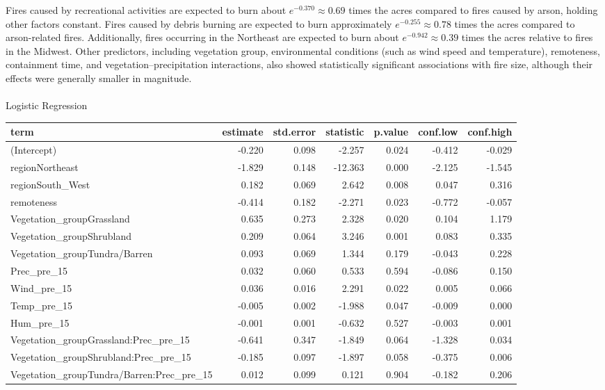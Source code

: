 \documentclass[
  letterpaper,
  DIV=11,
  numbers=noendperiod]{scrartcl}
\makeatletter
\let\oldparagraph\paragraph
\renewcommand{\paragraph}{
    \@ifstar
      \xxxParagraphStar
      \xxxParagraphNoStar
  }
\newcommand{\xxxParagraphStar}[1]{\oldparagraph*{#1}\mbox{}}
\newcommand{\xxxParagraphNoStar}[1]{\oldparagraph{#1}\mbox{}}
\makeatother
\begin{document}
Fires caused by recreational activities are expected to burn about
\(e^{-0.370} \approx 0.69\) times the acres compared to fires caused by
arson, holding other factors constant. Fires caused by debris burning
are expected to burn approximately \(e^{-0.255} \approx 0.78\) times the
acres compared to arson-related fires. Additionally, fires occurring in
the Northeast are expected to burn about \(e^{-0.942} \approx 0.39\)
times the acres relative to fires in the Midwest. Other predictors,
including vegetation group, environmental conditions (such as wind speed
and temperature), remoteness, containment time, and
vegetation--precipitation interactions, also showed statistically
significant associations with fire size, although their effects were
generally smaller in magnitude.

\paragraph{Logistic Regression}\label{logistic-regression-1}

\begin{table}[!h]
\centering\begingroup\fontsize{7}{9}\selectfont

\begin{tabular}{lrrrrrr}
\toprule
term & estimate & std.error & statistic & p.value & conf.low & conf.high\\
\midrule
(Intercept) & -0.220 & 0.098 & -2.257 & 0.024 & -0.412 & -0.029\\
regionNortheast & -1.829 & 0.148 & -12.363 & 0.000 & -2.125 & -1.545\\
regionSouth\_West & 0.182 & 0.069 & 2.642 & 0.008 & 0.047 & 0.316\\
remoteness & -0.414 & 0.182 & -2.271 & 0.023 & -0.772 & -0.057\\
Vegetation\_groupGrassland & 0.635 & 0.273 & 2.328 & 0.020 & 0.104 & 1.179\\
\addlinespace
Vegetation\_groupShrubland & 0.209 & 0.064 & 3.246 & 0.001 & 0.083 & 0.335\\
Vegetation\_groupTundra/Barren & 0.093 & 0.069 & 1.344 & 0.179 & -0.043 & 0.228\\
Prec\_pre\_15 & 0.032 & 0.060 & 0.533 & 0.594 & -0.086 & 0.150\\
Wind\_pre\_15 & 0.036 & 0.016 & 2.291 & 0.022 & 0.005 & 0.066\\
Temp\_pre\_15 & -0.005 & 0.002 & -1.988 & 0.047 & -0.009 & 0.000\\
\addlinespace
Hum\_pre\_15 & -0.001 & 0.001 & -0.632 & 0.527 & -0.003 & 0.001\\
Vegetation\_groupGrassland:Prec\_pre\_15 & -0.641 & 0.347 & -1.849 & 0.064 & -1.328 & 0.034\\
Vegetation\_groupShrubland:Prec\_pre\_15 & -0.185 & 0.097 & -1.897 & 0.058 & -0.375 & 0.006\\
Vegetation\_groupTundra/Barren:Prec\_pre\_15 & 0.012 & 0.099 & 0.121 & 0.904 & -0.182 & 0.206\\
\bottomrule
\end{tabular}
\endgroup{}
\end{table}
\end{document}
